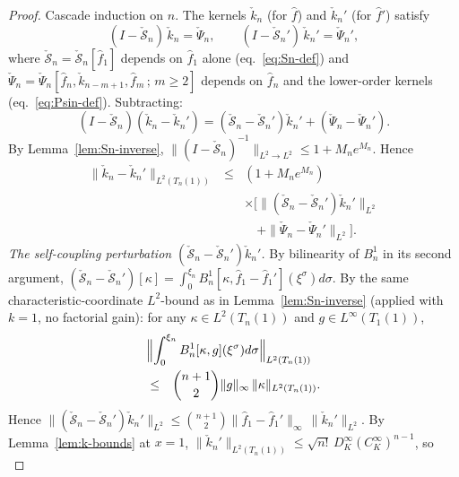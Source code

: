 \documentclass[journal,twoside,web]{ieeecolor}
\begin{document}
\begin{proof}
Cascade induction on $n$. The kernels $\check k_n$ (for $\hat f$) and $\check k_n'$ (for $\hat f'$) satisfy
\begin{equation}\label{eq:k-IE-pair}
(I-\check{\mathcal S}_n)\,\check k_n=\check\Psi_n,\qquad (I-\check{\mathcal S}_n')\,\check k_n'=\check\Psi_n',
\end{equation}
where $\check{\mathcal S}_n=\check{\mathcal S}_n[\hat f_1]$ depends on $\hat f_1$ alone (eq.~\eqref{eq:Sn-def}) and $\check\Psi_n=\check\Psi_n[\hat f_n,\check k_{n-m+1},\hat f_m\,;\,m\ge 2]$ depends on $\hat f_n$ and the lower-order kernels (eq.~\eqref{eq:Psin-def}). Subtracting:
\begin{equation}\label{eq:k-diff-IE}
(I-\check{\mathcal S}_n)(\check k_n-\check k_n')=(\check{\mathcal S}_n-\check{\mathcal S}_n')\check k_n'+(\check\Psi_n-\check\Psi_n').
\end{equation}
By Lemma~\ref{lem:Sn-inverse}, $\|(I-\check{\mathcal S}_n)^{-1}\|_{L^2\to L^2}\le 1+M_n e^{M_n}$. Hence
\begin{eqnarray}
\|\check k_n-\check k_n'\|_{L^2(T_n(1))} &\le& (1+M_n e^{M_n}) \nonumber\\
&& \times\Big[\|(\check{\mathcal S}_n-\check{\mathcal S}_n')\check k_n'\|_{L^2} \nonumber\\
&& \quad+\|\check\Psi_n-\check\Psi_n'\|_{L^2}\Big]. \label{eq:k-diff-L2}
\end{eqnarray}
\emph{The self-coupling perturbation $(\check{\mathcal S}_n-\check{\mathcal S}_n')\check k_n'$.} By bilinearity of $B^1_n$ in its second argument, $(\check{\mathcal S}_n-\check{\mathcal S}_n')[\kappa]=\int_0^{\xi_n}B^1_n[\kappa,\hat f_1-\hat f_1'](\xi^\sigma)d\sigma$. By the same characteristic-coordinate $L^2$-bound as in Lemma~\ref{lem:Sn-inverse} (applied with $k=1$, no factorial gain): for any $\kappa\in L^2(T_n(1))$ and $g\in L^\infty(T_1(1))$,
\begin{eqnarray}
\lefteqn{\Bigl\|\int_0^{\xi_n}B^1_n[\kappa,g](\xi^\sigma)d\sigma\Bigr\|_{L^2(T_n(1))}} \nonumber\\
&\le& \binom{n+1}{2}\|g\|_\infty\,\|\kappa\|_{L^2(T_n(1))}. \label{eq:S-diff-bound}
\end{eqnarray}
Hence $\|(\check{\mathcal S}_n-\check{\mathcal S}_n')\check k_n'\|_{L^2}\le \binom{n+1}{2}\|\hat f_1-\hat f_1'\|_\infty\,\|\check k_n'\|_{L^2}$. By Lemma~\ref{lem:k-bounds} at $x=1$, $\|\check k_n'\|_{L^2(T_n(1))}\le\sqrt{n!}\,D_K^\infty(C_K^\infty)^{n-1}$, so
\begin{equation}\label{eq:S-diff-final}

\end{equation}
\end{proof}
\end{document}
